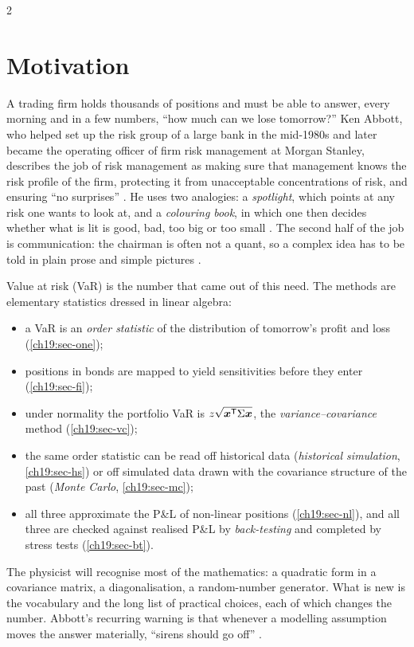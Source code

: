 \begin{paracol}{2}
\section*{Motivation}
A trading firm holds thousands of positions and must be able to answer, every morning and in a few numbers, ``how much can we lose tomorrow?'' Ken Abbott, who helped set up the risk group of a large bank in the mid-1980s and later became the operating officer of firm risk management at Morgan Stanley, describes the job of risk management as making sure that management knows the risk profile of the firm, protecting it from unacceptable concentrations of risk, and ensuring ``no surprises'' . He uses two analogies: a \emph{spotlight}, which points at any risk one wants to look at, and a \emph{colouring book}, in which one then decides whether what is lit is good, bad, too big or too small . The second half of the job is communication: the chairman is often not a quant, so a complex idea has to be told in plain prose and simple pictures .

Value at risk (VaR) is the number that came out of this need. The methods are elementary statistics dressed in linear algebra:
\begin{itemize}
  \item a VaR is an \emph{order statistic} of the distribution of tomorrow's profit and loss (\cref{ch19:sec-one});
  \item positions in bonds are mapped to yield sensitivities before they enter (\cref{ch19:sec-fi});
  \item under normality the portfolio VaR is $z\sqrt{\bm x^{\mathsf T}\Sigma\bm x}$, the \emph{variance--covariance} method (\cref{ch19:sec-vc});
  \item the same order statistic can be read off historical data (\emph{historical simulation}, \cref{ch19:sec-hs}) or off simulated data drawn with the covariance structure of the past (\emph{Monte Carlo}, \cref{ch19:sec-mc});
  \item all three approximate the P\&L of non-linear positions (\cref{ch19:sec-nl}), and all three are checked against realised P\&L by \emph{back-testing} and completed by stress tests (\cref{ch19:sec-bt}).
\end{itemize}
The physicist will recognise most of the mathematics: a quadratic form in a covariance matrix, a diagonalisation, a random-number generator. What is new is the vocabulary and the long list of practical choices, each of which changes the number. Abbott's recurring warning is that whenever a modelling assumption moves the answer materially, ``sirens should go off'' .


\end{paracol}
